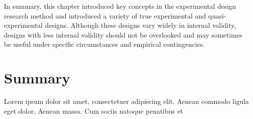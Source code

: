 In summary, this chapter introduced key concepts in the experimental design research method and introduced a variety of true experimental and quasi-experimental designs. Although these designs vary widely in internal validity, designs with less internal validity should not be overlooked and may sometimes be useful under specific circumstances and empirical contingencies.





\section{Summary}\label{ch09:summary}

Lorem ipsum dolor sit amet, consectetuer adipiscing elit. Aenean commodo ligula eget dolor. Aenean massa. Cum sociis natoque penatibus et
